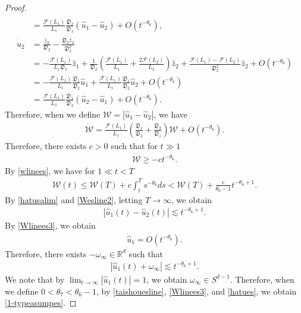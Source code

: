 \documentclass[reqno]{amsart}
\theoremstyle{plain}
\theoremstyle{definition}
\numberwithin{equation}{section}
\begin{document}
\begin{proof}
\begin{align*}
\\
&=\frac{\mathcal{F}(L_1)}{L_1}\frac{\mathfrak{D}_2}{\mathfrak{D}_1}\left(\hat{u}_1-\hat{u}_2\right)+O\left(t^{-\theta_6}\right),
\\
\dot{\hat{u}}_2&=\frac{\dot{\hat{z}}_2}{\mathfrak{D}_2}-\frac{\dot{\mathfrak{D}}_2\hat{z}_2}{\mathfrak{D}_2^2}
\\
&=-\frac{\mathcal{F}(L_1)}{L_1\mathfrak{D}_2}\hat{z}_1+\frac{1}{\mathfrak{D}_2}\left(\frac{\mathcal{F}(L_1)}{L_1}+\frac{2\mathcal{F}(L_2)}{L_2}\right)\hat{z}_2+\frac{\mathcal{F}(L_1)-\mathcal{F}(L_2)}{\mathfrak{D}_2^2}\hat{z}_2+O\left(t^{-\theta_6}\right)
\\
&=-\frac{\mathcal{F}(L_1)}{L_1}\frac{\mathfrak{D}_1}{\mathfrak{D}_2}\hat{u}_1+\frac{\mathcal{F}(L_1)}{L_1}\frac{\mathfrak{D}_1}{\mathfrak{D}_2}\hat{u}_2+O\left(t^{-\theta_6}\right)
\\
&=\frac{\mathcal{F}(L_1)}{L_1}\frac{\mathfrak{D}_1}{\mathfrak{D}_2}\left(\hat{u}_2-\hat{u}_1\right)+O\left(t^{-\theta_6}\right).
\end{align*}
Therefore, when we define $\mathcal{W}=\left|\hat{u}_1-\hat{u}_2\right|$, we have
\begin{align*}
\dot{\mathcal{W}}=\frac{\mathcal{F}(L_1)}{L_1}\left(\frac{\mathfrak{D}_1}{\mathfrak{D}_2}+\frac{\mathfrak{D}_2}{\mathfrak{D}_1}\right)\mathcal{W}+O\left(t^{-\theta_6}\right).
\end{align*}
Therefore, there exists $c>0$ such that for $t\gg 1$
\begin{align}\label{wlinees}
\dot{\mathcal{W}}\geq -ct^{-\theta_6}.
\end{align}
By \eqref{wlinees}, we have for $1\ll t<T$
\begin{align}\label{Wesline2}
\mathcal{W}(t)\leq \mathcal{W}(T)+c\int_t^Ts^{-\theta_6}ds<\mathcal{W}(T)+\frac{c}{\theta_6-1}t^{-\theta_6+1}.
\end{align}
By \eqref{hatusalim} and \eqref{Wesline2}, letting $T\to\infty$, we obtain
\begin{align}\label{Wlinees3}
\left|\hat{u}_1(t)-\hat{u}_2(t)\right|\lesssim t^{-\theta_6+1}.
\end{align}
By \eqref{Wlinees3}, we obtain
\begin{align*}
\dot{\hat{u}}_1=O\left(t^{-\theta_6}\right).
\end{align*}
Therefore, there exists $-\omega_{\infty}\in\mathbb{R}^d$ such that 
\begin{align}\label{hatues}
\left|\hat{u}_1(t)+\omega_{\infty}\right|\lesssim t^{-\theta_6+1}.
\end{align}
We note that by $\lim_{t\to\infty}|\hat{u}_1(t)|=1$, we obtain $\omega_{\infty}\in S^{d-1}$. Therefore, when we define $0<\theta_7<\theta_6-1$, by \eqref{taishouesline}, \eqref{Wlinees3}, and \eqref{hatues}, we obtain \eqref{1-typeasumpes}.
\end{proof}
\end{document}
